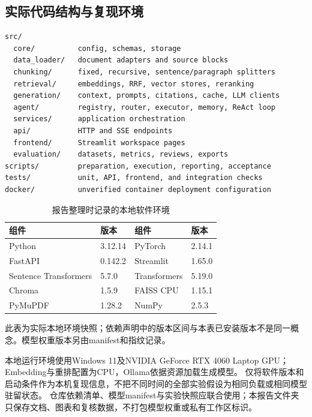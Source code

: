\documentclass[UTF8,a4paper,zihao=-4,fontset=fandol]{ctexart}
\newcommand{\ReportTableStyle}{\fontsize{10.5}{14}\selectfont\setstretch{1.15}%
 \setlength{\tabcolsep}{4.5pt}\renewcommand{\arraystretch}{1.28}}
\begin{document}
\subsection{实际代码结构与复现环境}
\begin{lstlisting}
src/
  core/          config, schemas, storage
  data_loader/   document adapters and source blocks
  chunking/      fixed, recursive, sentence/paragraph splitters
  retrieval/     embeddings, RRF, vector stores, reranking
  generation/    context, prompts, citations, cache, LLM clients
  agent/         registry, router, executor, memory, ReAct loop
  services/      application orchestration
  api/           HTTP and SSE endpoints
  frontend/      Streamlit workspace pages
  evaluation/    datasets, metrics, reviews, exports
scripts/         preparation, execution, reporting, acceptance
tests/           unit, API, frontend, and integration checks
docker/          unverified container deployment configuration
\end{lstlisting}
\begin{table}[htbp]\centering
\caption{报告整理时记录的本地软件环境}\label{tab:environment}
\ReportTableStyle
\begin{tabularx}{\linewidth}{@{}XlXl@{}}\toprule\rowcolor{TableHead}
\textbf{组件} & \textbf{版本} & \textbf{组件} & \textbf{版本} \\ \midrule
Python & 3.12.14 & PyTorch & 2.14.1 \\
FastAPI & 0.142.2 & Streamlit & 1.65.0 \\
Sentence Transformers & 5.7.0 & Transformers & 5.19.0 \\
Chroma & 1.5.9 & FAISS CPU & 1.15.1 \\
PyMuPDF & 1.28.2 & NumPy & 2.5.3 \\
\bottomrule\end{tabularx}
\par\vspace{2pt}\begin{minipage}{\linewidth}\footnotesize 此表为实际本地环境快照；依赖声明中的版本区间与本表已安装版本不是同一概念。模型权重版本另由manifest和指纹记录。\end{minipage}
\end{table}
本地运行环境使用Windows 11及NVIDIA GeForce RTX 4060 Laptop GPU；Embedding与重排配置为CPU，Ollama依据资源加载生成模型。
仅将软件版本和启动条件作为本机复现信息，不把不同时间的全部实验假设为相同负载或相同模型驻留状态。
仓库依赖清单、模型manifest与实验快照应联合使用；本报告文件夹只保存文档、图表和复核数据，不打包模型权重或私有工作区标识。
\end{document}
